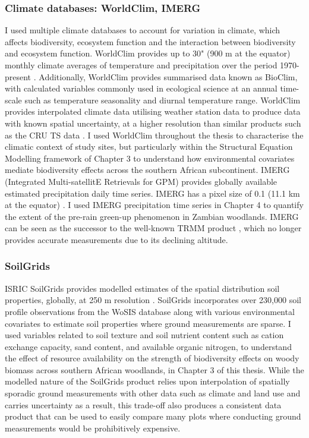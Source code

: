 \begin{refsection}
\subsubsection{Climate databases: WorldClim, IMERG}
\label{intro:sssec:clim}

I used multiple climate databases to account for variation in climate, which affects biodiversity, ecosystem function and the interaction between biodiversity and ecosystem function. WorldClim provides up to 30" (\textapprox{}900 m at the equator) monthly climate averages of temperature and precipitation over the period 1970-present \citep{Fick2017}. Additionally, WorldClim provides summarised data known as BioClim, with calculated variables commonly used in ecological science at an annual time-scale such as temperature seasonality and diurnal temperature range. WorldClim provides interpolated climate data utilising weather station data to produce data with known spatial uncertainty, at a higher resolution than similar products such as the CRU TS data \citep{Harris2013}. I used WorldClim throughout the thesis to characterise the climatic context of study sites, but particularly within the Structural Equation Modelling framework of Chapter 3 to understand how environmental covariates mediate biodiversity effects across the southern African subcontinent. IMERG (Integrated Multi-satellitE Retrievals for GPM) \citep{IMERG} provides globally available estimated precipitation daily time series. IMERG has a pixel size of 0.1\textdegree{} (11.1 km at the equator) \citep{IMERG}. I used IMERG precipitation time series in Chapter 4 to quantify the extent of the pre-rain green-up phenomenon in Zambian woodlands. IMERG can be seen as the successor to the well-known TRMM product \citep{Bowman2007}, which no longer provides accurate measurements due to its declining altitude.

\subsubsection{SoilGrids}
\label{intro:sssec:soil}

ISRIC SoilGrids provides modelled estimates of the spatial distribution soil properties, globally, at 250 m resolution \citep{Hengl2017}. SoilGrids incorporates over 230,000 soil profile observations from the WoSIS database \citep{Batjes2017} along with various environmental covariates to estimate soil properties where ground measurements are sparse. I used variables related to soil texture and soil nutrient content such as cation exchange capacity, sand content, and available organic nitrogen, to understand the effect of resource availability on the strength of biodiversity effects on woody biomass across southern African woodlands, in Chapter 3 of this thesis. While the modelled nature of the SoilGrids product relies upon interpolation of spatially sporadic ground measurements with other data such as climate and land use and carries uncertainty as a result, this trade-off also produces a consistent data product that can be used to easily compare many plots where conducting ground measurements would be prohibitively expensive.


\end{refsection}
